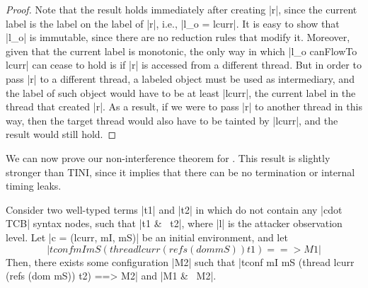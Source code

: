 \begin{proof}
  Note that the result holds immediately after creating |r|, since
  the current label is the label on the label of |r|, i.e., |l_o =
  lcurr|. It is easy to show that |l_o| is immutable, since there are
  no reduction rules that modify it. Moreover, given that the current
  label is monotonic, the only way in which |l_o canFlowTo lcurr| can
  cease to hold is if |r| is accessed from a different thread. But in
  order to pass |r| to a different thread, a labeled object must be
  used as intermediary, and the label of such object would have to be
  at least |lcurr|, the current label in the thread that created
  |r|. As a result, if we were to pass |r| to another thread in this
  way, then the target thread would also have to be tainted by
  |lcurr|, and the result would still hold.
\end{proof}

We can now prove our non-interference theorem for \lioconc. This result is
slightly stronger than TINI, since it implies that there can be no termination
or internal timing leaks.

\begin{theorem}
  Consider two well-typed terms |t1| and |t2| in
  \lioconc{} which do not contain any |cdot TCB| syntax nodes, such that |t1
  &~ t2|, where |l| is the attacker observation level.
  Let |c = (lcurr, mI, mS)| be an initial environment, and let
\[
 |tconf mI mS (thread lcurr (refs (dom mS)) t1) ==> M1|
\]
  Then, there exists some configuration |M2| such that |tconf mI mS (thread lcurr (refs (dom mS)) t2)
  ==> M2| and |M1 &~ M2|.
\end{theorem}

